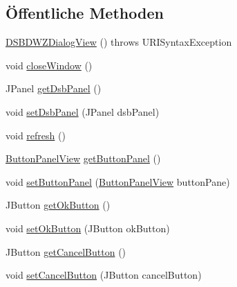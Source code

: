 \subsection*{Öffentliche Methoden}
\begin{DoxyCompactItemize}
\item 
\hyperlink{classde_1_1turnierverwaltung_1_1view_1_1_d_s_b_d_w_z_dialog_view_a342bcfd6cd23f15cecc7ca8204806d6e}{D\+S\+B\+D\+W\+Z\+Dialog\+View} ()  throws U\+R\+I\+Syntax\+Exception 
\item 
void \hyperlink{classde_1_1turnierverwaltung_1_1view_1_1_d_s_b_d_w_z_dialog_view_a8de4b650a6ee1158e25273389ac74315}{close\+Window} ()
\item 
J\+Panel \hyperlink{classde_1_1turnierverwaltung_1_1view_1_1_d_s_b_d_w_z_dialog_view_a7f013c1c9b0d16b07682938ca2a5bfdc}{get\+Dsb\+Panel} ()
\item 
void \hyperlink{classde_1_1turnierverwaltung_1_1view_1_1_d_s_b_d_w_z_dialog_view_ae75a4e64785595392c10906e61444fea}{set\+Dsb\+Panel} (J\+Panel dsb\+Panel)
\item 
void \hyperlink{classde_1_1turnierverwaltung_1_1view_1_1_d_s_b_d_w_z_dialog_view_a6384bb24e0899aa50e9248d674309885}{refresh} ()
\item 
\hyperlink{classde_1_1turnierverwaltung_1_1view_1_1_button_panel_view}{Button\+Panel\+View} \hyperlink{classde_1_1turnierverwaltung_1_1view_1_1_d_s_b_d_w_z_dialog_view_a23911141d33bdd1407439748eb92eed9}{get\+Button\+Panel} ()
\item 
void \hyperlink{classde_1_1turnierverwaltung_1_1view_1_1_d_s_b_d_w_z_dialog_view_a07fe0105150c204656b280402f4fd383}{set\+Button\+Panel} (\hyperlink{classde_1_1turnierverwaltung_1_1view_1_1_button_panel_view}{Button\+Panel\+View} button\+Pane)
\item 
J\+Button \hyperlink{classde_1_1turnierverwaltung_1_1view_1_1_d_s_b_d_w_z_dialog_view_a05b03a7946e8c2b7f2274b5b0c33873b}{get\+Ok\+Button} ()
\item 
void \hyperlink{classde_1_1turnierverwaltung_1_1view_1_1_d_s_b_d_w_z_dialog_view_a7dd0f908ead9aaf1a393e672dd7974b5}{set\+Ok\+Button} (J\+Button ok\+Button)
\item 
J\+Button \hyperlink{classde_1_1turnierverwaltung_1_1view_1_1_d_s_b_d_w_z_dialog_view_ad2a3097e1b7530dbd75abd24662452c6}{get\+Cancel\+Button} ()
\item 
void \hyperlink{classde_1_1turnierverwaltung_1_1view_1_1_d_s_b_d_w_z_dialog_view_a3659567a310cfc6bc3bf45903d87fb88}{set\+Cancel\+Button} (J\+Button cancel\+Button)
\item 

\end{DoxyCompactItemize}
